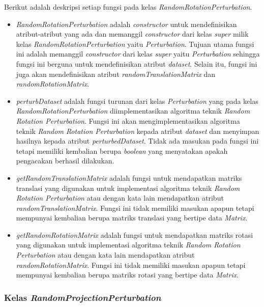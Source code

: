 Berikut adalah deskripsi setiap fungsi pada kelas \textit{RandomRotationPerturbation}.
\begin{itemize}
	\item \textit{RandomRotationPerturbation} adalah \textit{constructor} untuk mendefinisikan atribut-atribut yang ada dan memanggil \textit{constructor} dari kelas \textit{super} milik kelas \textit{RandomRotationPerturbation} yaitu \textit{Perturbation}. Tujuan utama fungsi ini adalah memanggil \textit{constructor} dari kelas \textit{super} yaitu \textit{Perturbation} sehingga fungsi ini berguna untuk mendefinisikan atribut \textit{\textit{dataset}}. Selain itu, fungsi ini juga akan mendefinisikan atribut \textit{randomTranslationMatrix} dan \textit{randomRotationMatrix}.
	\item \textit{perturbDataset} adalah fungsi turunan dari kelas \textit{Perturbation} yang pada kelas \textit{RandomRotationPerturbation} diimplementasikan algoritma teknik \textit{Random Rotation Perturbation}. Fungsi ini akan mengimplementasikan algoritma teknik \textit{Random Rotation Perturbation} kepada atribut \textit{\textit{dataset}} dan menyimpan hasilnya kepada atribut \textit{perturbedDataset}. Tidak ada masukan pada fungsi ini tetapi memiliki kembalian berupa \textit{boolean} yang menyatakan apakah pengacakan berhasil dilakukan.
	\item \textit{getRandomTranslationMatrix} adalah fungsi untuk mendapatkan matriks translasi yang digunakan untuk implementasi algoritma teknik \textit{Random Rotation Perturbation} atau dengan kata lain mendapatkan atribut \textit{randomTranslationMatrix}. Fungsi ini tidak memiliki masukan apapun tetapi mempunyai kembalian berupa matriks translasi yang bertipe data \textit{Matrix}.
	\item \textit{getRandomRotationMatrix} adalah fungsi untuk mendapatkan matriks rotasi yang digunakan untuk implementasi algoritma teknik \textit{Random Rotation Perturbation} atau dengan kata lain mendapatkan atribut \textit{randomRotationMatrix}. Fungsi ini tidak memiliki masukan apapun tetapi mempunyai kembalian berupa matriks rotasi yang bertipe data \textit{Matrix}.
\end{itemize}

\subsubsection{Kelas \textit{RandomProjectionPerturbation}}
\label{subsubsec:kelas-rpp}

